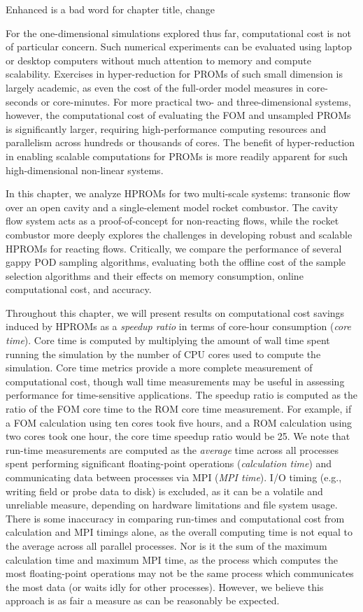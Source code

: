 {\color{red}Enhanced is a bad word for chapter title, change}

For the one-dimensional simulations explored thus far, computational cost is not of particular concern. Such numerical experiments can be evaluated using laptop or desktop computers without much attention to memory and compute scalability. Exercises in hyper-reduction for PROMs of such small dimension is largely academic, as even the cost of the full-order model measures in core-seconds or core-minutes. For more practical two- and three-dimensional systems, however, the computational cost of evaluating the FOM and unsampled PROMs is significantly larger, requiring high-performance computing resources and parallelism across hundreds or thousands of cores. The benefit of hyper-reduction in enabling scalable computations for PROMs is more readily apparent for such high-dimensional non-linear systems.

In this chapter, we analyze HPROMs for two multi-scale systems: transonic flow over an open cavity and a single-element model rocket combustor. The cavity flow system acts as a proof-of-concept for non-reacting flows, while the rocket combustor more deeply explores the challenges in developing robust and scalable HPROMs for reacting flows. Critically, we compare the performance of several gappy POD sampling algorithms, evaluating both the offline cost of the sample selection algorithms and their effects on memory consumption, online computational cost, and accuracy.

Throughout this chapter, we will present results on computational cost savings induced by HPROMs as a \textit{speedup ratio} in terms of core-hour consumption (\textit{core time}). Core time is computed by multiplying the amount of wall time spent running the simulation by the number of CPU cores used to compute the simulation. Core time metrics provide a more complete measurement of computational cost, though wall time measurements may be useful in assessing performance for time-sensitive applications. The speedup ratio is computed as the ratio of the FOM core time to the ROM core time measurement. For example, if a FOM calculation using ten cores took five hours, and a ROM calculation using two cores took one hour, the core time speedup ratio would be 25. We note that run-time measurements are computed as the \textit{average} time across all processes spent performing significant floating-point operations (\textit{calculation time}) and communicating data between processes via MPI (\textit{MPI time}). I/O timing (e.g., writing field or probe data to disk) is excluded, as it can be a volatile and unreliable measure, depending on hardware limitations and file system usage. There is some inaccuracy in comparing run-times and computational cost from calculation and MPI timings alone, as the overall computing time is not equal to the average across all parallel processes. Nor is it the sum of the maximum calculation time and maximum MPI time, as the process which computes the most floating-point operations may not be the same process which communicates the most data (or waits idly for other processes). However, we believe this approach is as fair a measure as can be reasonably be expected.

